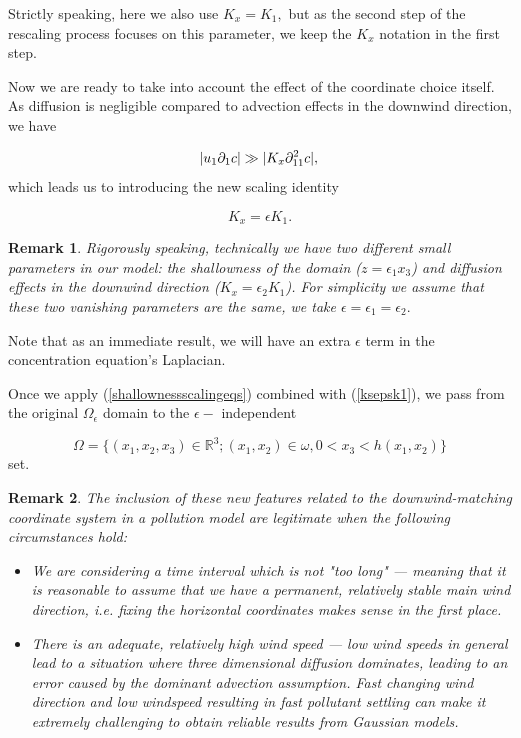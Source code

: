 \documentclass[11pt]{article}
\newtheorem{remark}{Remark}
\begin{document}
Strictly speaking, here we also use $K_x = K_1,$ but as the second step of the rescaling process focuses on this parameter, we keep the $K_x$ notation in the first step.

Now we are ready to take into account the effect of the coordinate choice itself. As diffusion is negligible compared to advection effects in the downwind direction, we have

\begin{equation} \abs{u_1 \partial_{1} c} \gg | K_x \partial_{11} ^2 c | ,\end{equation}
%
which leads us to introducing the new scaling identity

\begin{equation} \label{ksepsk1} K_x = \epsilon K_1. \end{equation}

\begin{remark}
Rigorously speaking, technically we have two different small parameters in our model: the shallowness of the domain ($z = \epsilon_1 x_3$) and diffusion effects in the downwind direction ($K_x = \epsilon_2 K_1$). For simplicity we assume that these two vanishing parameters are the same, we take $\epsilon = \epsilon_1 = \epsilon_2.$
\end{remark}

Note that as an immediate result, we will have an extra $\epsilon$ term in the concentration equation's Laplacian.

Once we apply (\ref{shallownessscalingeqs}) combined with (\ref{ksepsk1}), we pass from the original $\Omega_\epsilon$ domain to the $\epsilon-$ independent

\begin{equation} \Omega = \{(x_1,x_2,x_3) \in \mathbb{R}^3 ; (x_1,x_2) \in \omega, 0 < x_3 < h (x_1 , x_2) \} \end{equation}
%
set.

\begin{remark} \normalfont
The inclusion of these new features related to the downwind-matching coordinate system in a pollution model are legitimate when the following circumstances hold:
\begin{itemize}
\item We are considering a time interval which is not "too long" --- meaning that it is reasonable to assume that we have a permanent, relatively stable main wind direction, i.e. fixing the horizontal coordinates makes sense in the first place.
\item There is an adequate, relatively high wind speed --- low wind speeds in general lead to a situation where three dimensional diffusion dominates, leading to an error caused by the dominant advection assumption. Fast changing wind direction and low windspeed resulting in fast pollutant settling can make it extremely challenging to obtain reliable results from Gaussian models.
\end{itemize}
\end{remark}
\end{document}

